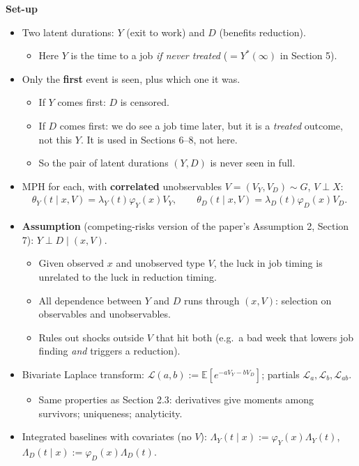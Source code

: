 \documentclass[11pt]{article}
\newcommand{\E}{\mathbb{E}}
\newcommand{\1}{\mathbf{1}}
\newcommand{\Lap}{\mathcal{L}}
\begin{document}
\textbf{Set-up}
\begin{itemize}
  \item Two latent durations: $Y$ (exit to work) and $D$ (benefits reduction).
    \begin{itemize}
      \item Here $Y$ is the time to a job \emph{if never treated} ($=Y^*(\infty)$ in Section 5).
    \end{itemize}
  \item Only the \textbf{first} event is seen, plus which one it was.
    \begin{itemize}
      \item If $Y$ comes first: $D$ is censored.
      \item If $D$ comes first: we do see a job time later, but it is a \emph{treated} outcome, not this $Y$. It is used in Sections 6--8, not here.
      \item So the pair of latent durations $(Y,D)$ is never seen in full.
    \end{itemize}
  \item MPH for each, with \textbf{correlated} unobservables $V=(V_Y,V_D)\sim G$, $V\perp X$:
  \begin{align}
    \theta_Y(t\mid x,V)=\lambda_Y(t)\varphi_Y(x)V_Y, \qquad \theta_D(t\mid x,V)=\lambda_D(t)\varphi_D(x)V_D. \nonumber
  \end{align}
  \item \textbf{Assumption} (competing-risks version of the paper's Assumption 2, Section 7): $Y\perp D\mid(x,V)$.
    \begin{itemize}
      \item Given observed $x$ and unobserved type $V$, the luck in job timing is unrelated to the luck in reduction timing.
      \item All dependence between $Y$ and $D$ runs through $(x,V)$: selection on observables and unobservables.
      \item Rules out shocks outside $V$ that hit both (e.g.\ a bad week that lowers job finding \emph{and} triggers a reduction).
    \end{itemize}
  \item Bivariate Laplace transform: $\Lap(a,b):=\E[e^{-aV_Y-bV_D}]$; partials $\Lap_a,\Lap_b,\Lap_{ab}$.
    \begin{itemize}
      \item Same properties as Section 2.3: derivatives give moments among survivors; uniqueness; analyticity.
    \end{itemize}
  \item Integrated baselines with covariates (no $V$): $\Lambda_Y(t\mid x):=\varphi_Y(x)\Lambda_Y(t)$, \ $\Lambda_D(t\mid x):=\varphi_D(x)\Lambda_D(t)$.
\end{itemize}
\end{document}
